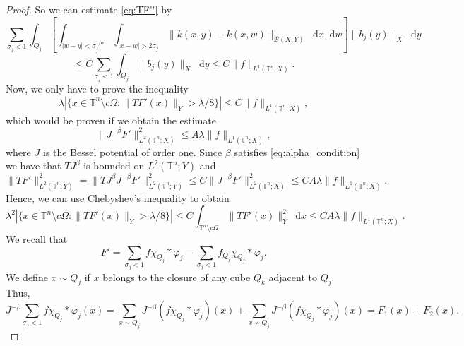 \documentclass[12pt, reqno]{amsart}
\theoremstyle{definition}
\theoremstyle{remark}
\numberwithin{equation}{section}
\newcommand*\diff{\mathop{}\!\mathrm{d}}
\begin{document}
\begin{proof}
    So we can estimate \cref{eq:TF''} by 
    \begin{equation*}
          \sum_{\sigma_j< 1}\int_{Q_j}\left[\int_{|w-y|<\sigma_j^{1/\alpha}}\int_{|x-w|>2\sigma_j}\|k(x, y) - k(x, w)\|_{\mathcal{B}(X,Y)}\diff x \diff w\right] \|b_j(y)\|_X\diff y
    \end{equation*}
    \begin{equation*}
        \leq C\sum_{\sigma_j<1} \int_{Q_j}\|b_j(y)\|_X\diff y  \leq C\|f\|_{L^1(\mathbb{T}^n; X)}.
    \end{equation*}
    Now, we only have to prove the inequality
    \begin{equation*}
    \lambda |\{ x \in \mathbb{T}^n \setminus c\Omega : \|TF'(x)\|_Y > \lambda/8 \}| \leq C\|f\|_{L^1(\mathbb{T}^n; X)},
    \end{equation*}
    which would be proven if we obtain the estimate 
    \begin{equation}
        \|J^{-\beta} F'\|_{L^2(\mathbb{T}^n; X)}^2 \leq A\lambda \|f\|_{L^1(\mathbb{T}^n; X)},
    \end{equation}
    where $J$ is the Bessel potential of order one. Since $\beta$ satisfies \cref{eq:alpha_condition} we have  that $TJ^{\beta}$ is bounded on $L^2(\mathbb{T}^n;Y)$ and
    \begin{equation*}
        \|T F'\|_{L^2(\mathbb{T}^n; Y)}^2 =\|TJ^{\beta}J^{-\beta }F'\|_{L^2(\mathbb{T}^n; Y)}^2 \leq  C\|J^{-\beta} F'\|_{L^2(\mathbb{T}^n; X)}^2 \leq CA\lambda \|f\|_{L^1(\mathbb{T}^n; X)}.
    \end{equation*}
    Hence, we can use  Chebyshev's inequality to obtain
    \begin{equation*}
        \lambda^2 |\{ x \in \mathbb{T}^n \setminus c\Omega : \|TF'(x)\|_Y > \lambda/8 \}| \leq C \int_{\mathbb{T}^n \setminus c\Omega} \|TF'(x)\|_Y^2\diff x  \leq CA\lambda\|f\|_{L^1(\mathbb{T}^n; X)}.
    \end{equation*}
    We recall that
    \begin{equation*}
        F' = \sum_{\sigma_j < 1}f\chi_{Q_j} * \varphi_j - \sum_{\sigma_j < 1}f_{Q_j}\chi_{Q_j}*\varphi_j.
    \end{equation*}
    We define $x \sim Q_j$ if $x$ belongs to the closure of any cube $Q_k$ adjacent to $Q_j$. Thus, 
    \begin{equation*}
        J^{-\beta}\sum_{\sigma_j < 1}f\chi_{Q_j} * \varphi_j (x) = \sum_{x\sim Q_j}J^{-\beta} (f\chi_{Q_j} * \varphi_j )(x) + \sum_{x\nsim Q_j}J^{-\beta} (f\chi_{Q_j} * \varphi_j )(x)  = F_1(x) + F_2(x).
    \end{equation*}

\end{proof}
\end{document}
